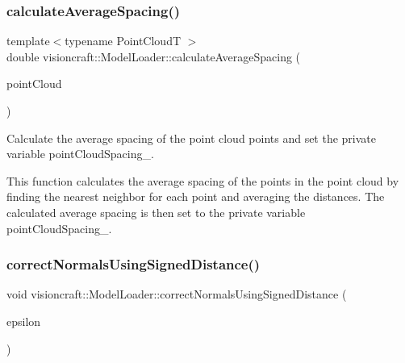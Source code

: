 \subsubsection{\texorpdfstring{calculate\+Average\+Spacing()}{calculateAverageSpacing()}}
{\footnotesize\ttfamily template$<$typename Point\+CloudT $>$ \\
double visioncraft\+::\+Model\+Loader\+::calculate\+Average\+Spacing (\begin{DoxyParamCaption}\item[{const typename Point\+Cloud\+T\+::\+Ptr \&}]{point\+Cloud }\end{DoxyParamCaption})}



Calculate the average spacing of the point cloud points and set the private variable point\+Cloud\+Spacing\+\_\+. 

This function calculates the average spacing of the points in the point cloud by finding the nearest neighbor for each point and averaging the distances. The calculated average spacing is then set to the private variable point\+Cloud\+Spacing\+\_\+. \mbox{\label{classvisioncraft_1_1ModelLoader_aea05858fcfeca8281df779dc8ba08acf}} 
\subsubsection{\texorpdfstring{correct\+Normals\+Using\+Signed\+Distance()}{correctNormalsUsingSignedDistance()}\hspace{0.1cm}{\footnotesize\ttfamily [1/2]}}
{\footnotesize\ttfamily void visioncraft\+::\+Model\+Loader\+::correct\+Normals\+Using\+Signed\+Distance (\begin{DoxyParamCaption}\item[{double}]{epsilon }\end{DoxyParamCaption})}

\mbox{\label{classvisioncraft_1_1ModelLoader_a42b8e7af7cf349fc4dce108198927372}} 
